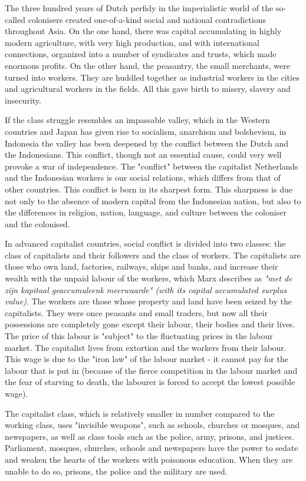 The three hundred years of Dutch perfidy in the imperialistic world of 
the so-called colonisers created one-of-a-kind social and national 
contradictions throughout Asia. On the one hand, there was capital 
accumulating in highly modern agriculture, with very high production, 
and with international connections, organized into a number of syndicates 
and trusts, which made enormous profits. On the other hand, the peasantry, 
the small merchants, were turned into workers. They are huddled together as 
industrial workers in the cities and agricultural workers in the fields. All this gave birth to misery, slavery and insecurity.\nline

If the class struggle resembles an impassable valley, which in 
the Western countries and Japan has given rise to socialism, anarchism 
and bolshevism, in Indonesia the valley has been deepened by the conflict 
between the Dutch and the Indonesians. This conflict, though not an essential 
cause, could very well provoke a war of independence. The "conflict" between 
the capitalist Netherlands and the Indonesian workers is our social relations, 
which differs from that of other countries. This conflict is born in its sharpest 
form. This sharpness is due not only to the absence of modern capital from the 
Indonesian nation, but also to the differences in religion, nation, language, and culture between the coloniser and the colonised.\nline

In advanced capitalist countries, social conflict is divided into two classes: 
the class of capitalists and their followers and the class of workers. The capitalists 
are those who own land, factories, railways, ships and banks, and increase their wealth 
with the unpaid labour of the workers, which Marx describes as \emph{"met de zijn kapitaal geaccumuleenk meerwaarde" (with its capital accumulated surplus value)}. 
The workers are those whose property and land have been seized by the capitalists. They were once peasants and small traders, 
but now all their possessions are completely gone except their labour, their bodies and their lives. The price of this labour 
is "subject" to the fluctuating prices in the labour market. The capitalist lives from extortion and the workers from their 
labour. This wage is due to the "iron law" of the labour market - it cannot pay for the labour that is put in 
(because of the fierce competition in the labour market and the fear of starving to death, the labourer is forced to 
accept the lowest possible wage).\nline

The capitalist class, which is relatively smaller in number compared to the working class, 
uses "invisible weapons", such as schools, churches or mosques, and newspapers, as well 
as class tools such as the police, army, prisons, and justices. Parliament, mosques, 
churches, schools and newspapers have the power to sedate and weaken the hearts of the 
workers with poisonous education. When they are unable to do so, prisons, the police and the military are used.\nline

